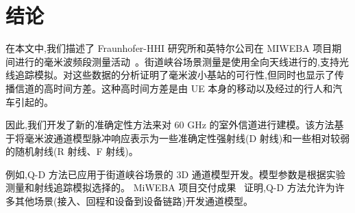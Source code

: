 \section{结论}
在本文中,我们描述了 Fraunhofer-HHI 研究所和英特尔公司在 MIWEBA 项目期间进行的毫米波频段测量活动~\cite{miweba2013}。街道峡谷场景测量是使用全向天线进行的,支持光线追踪模拟。对这些数据的分析证明了毫米波小基站的可行性,但同时也显示了传播信道的高时间方差。这种高时间方差是由 UE 本身的移动以及经过的行人和汽车引​​起的。

因此,我们开发了新的准确定性方法来对 60 GHz 的室外信道进行建模。该方法基于将毫米波通道模型脉冲响应表示为一些准确定性强射线(D 射线)和一些相对较弱的随机射线(R 射线、F 射线)。

例如,Q-D 方法已应用于街道峡谷场景的 3D 通道模型开发。模型参数是根据实验测量和射线追踪模拟选择的。 MiWEBA 项目交付成果~\cite{miweba2014} 证明,Q-D 方法允许为许多其他场景(接入、回程和设备到设备链路)开发通道模型。



\begingroup
    \printbibliography[title={外文翻译参考文献}]
\endgroup

